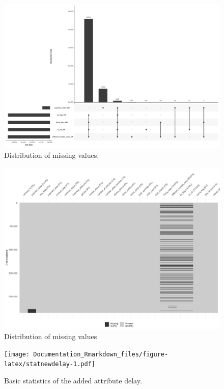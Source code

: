 \documentclass[
]{article}
\begin{document}
\begin{figure}
\includegraphics[width=0.9\linewidth]{Documentation_Rmarkdown_files/figure-latex/Missing-complex-1} \caption{\label{fig:Missing-complex}Distribution of missing values.}\label{fig:Missing-complex}
\end{figure}

\begin{figure}
\includegraphics[width=0.9\linewidth]{missing_values_plot} \caption{\label{fig:missing-H}Distribution of missing values}\label{fig:missing-H}
\end{figure}

\begin{figure}
\centering
\texttt{[image: Documentation\_Rmarkdown\_files/figure-latex/statnewdelay-1.pdf]}
\caption{\label{fig:statnewdelay}\label{fig:stat-newdelay}Basic statistics of the added attribute delay.}
\end{figure}
\end{document}
